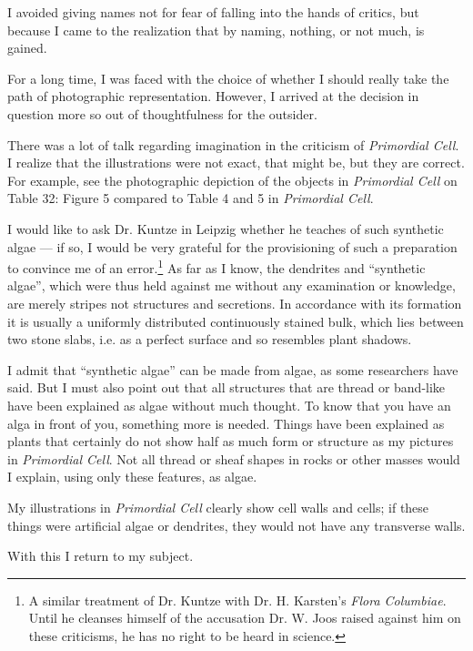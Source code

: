 \documentclass[a4paper, 12pt, oneside]{article}
\begin{document}
I avoided giving names not for fear of falling into the hands of critics, but because I came to the realization that by naming, nothing, or not much, is gained.

For a long time, I was faced with the choice of whether I should really take the path of photographic representation. However, I arrived at the decision in question more so out of thoughtfulness for the outsider.

There was a lot of talk regarding imagination in the criticism of \emph{Primordial Cell}. I realize that the illustrations were not exact, that might be, but they are correct. For example, see the photographic depiction of the objects in \emph{Primordial Cell} on Table 32: Figure 5 compared to Table 4 and 5 in \emph{Primordial Cell}.

I would like to ask Dr. Kuntze in Leipzig whether he teaches of such synthetic algae --- if so, I would be very grateful for the provisioning of such a preparation to convince me of an error.\footnote{A similar treatment of Dr. Kuntze with Dr. H. Karsten's \emph{Flora Columbiae}. Until he cleanses himself of the accusation Dr. W. Joos raised against him on these criticisms, he has no right to be heard in science.} As far as I know, the dendrites and ``synthetic algae'', which were thus held against me without any examination or knowledge, are merely stripes not structures and secretions. In accordance with its formation it is usually a uniformly distributed continuously stained bulk, which lies between two stone slabs, i.e. as a perfect surface and so resembles plant shadows.

I admit that ``synthetic algae'' can be made from algae, as some researchers have said. But I must also point out that all structures that are thread or band-like have been explained as algae without much thought. To know that you have an alga in front of you, something more is needed. Things have been explained as plants that certainly do not show half as much form or structure as my pictures in \emph{Primordial Cell}. Not all thread or sheaf shapes in rocks or other masses would I explain, using only these features, as algae.

My illustrations in \emph{Primordial Cell} clearly show cell walls and cells; if these things were artificial algae or dendrites, they would not have any transverse walls.

With this I return to my subject.
\end{document}
